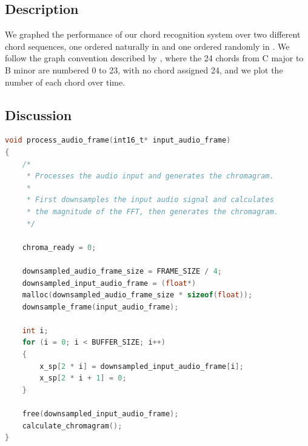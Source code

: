 \documentclass[journal]{IEEEtran}
\begin{document}
\subsection{Description}
We graphed the performance of our chord recognition system over two different chord sequences, one ordered naturally in  and one ordered randomly in .
We follow the graph convention described by \cite{harte}, where the 24 chords from C major to B minor are numbered 0 to 23, with no chord assigned 24, and we plot the number of each chord over time.


\subsection{Discussion}






\onecolumn
\begin{lstlisting}[language = C, frame = single, caption = {An example code snippet from the chroma feature extraction containing the \texttt{process\_audio\_frame()} function.
This function is located in the \texttt{chromagram.c} file.}, captionpos = b, label = code:audio]
void process_audio_frame(int16_t* input_audio_frame)
{
    /*
     * Processes the audio input and generates the chromagram.
     *
     * First downsamples the input audio signal and calculates 
     * the magnitude of the FFT, then generates the chromagram.
     */

    chroma_ready = 0;

    downsampled_audio_frame_size = FRAME_SIZE / 4;
    downsampled_input_audio_frame = (float*)
    malloc(downsampled_audio_frame_size * sizeof(float));
    downsample_frame(input_audio_frame);

    int i;
    for (i = 0; i < BUFFER_SIZE; i++)
    {
        x_sp[2 * i] = downsampled_input_audio_frame[i];
        x_sp[2 * i + 1] = 0;
    }

    free(downsampled_input_audio_frame);
    calculate_chromagram();
}
\end{lstlisting}
\end{document}
